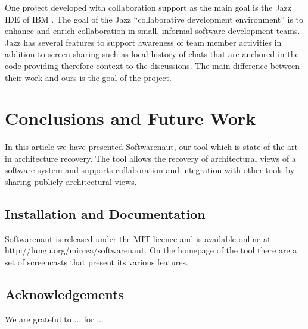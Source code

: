 \documentclass[preprint,12pt]{elsarticle}
\begin{document}
One project developed with collaboration support as the main goal is the Jazz IDE of IBM \cite{hupfer-jazz}. The goal of the Jazz ``collaborative development environment'' is to enhance and enrich collaboration in small, informal software development teams. Jazz has several features to support awareness of team member activities in addition to screen sharing such as local history of chats that are anchored in the code providing therefore context to the discussions. The main difference between their work and ours is the goal of the project.





\newpage
\section {Conclusions and Future Work}
\label {sec:conc}

In this article we have presented Softwarenaut, our tool which is state of the art in architecture recovery. The tool allows the recovery of architectural views of a software system and supports collaboration and integration with other tools by sharing publicly architectural views.


\subsection* {Installation and Documentation}
Softwarenaut is released under the MIT licence and is available online at http://lungu.org/mircea/softwarenaut. On the homepage of the tool there are a set of screencasts that present its various features. 

\subsection* {Acknowledgements} We are grateful to ... for ...


\newpage



\end{document}
